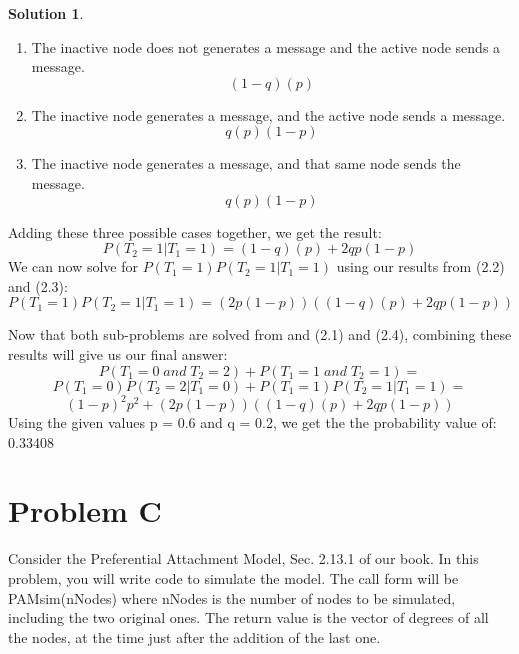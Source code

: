 \documentclass[paper=a4, fontsize=11pt]{scrartcl} %
\numberwithin{equation}{section} %
\numberwithin{figure}{section} %
\numberwithin{table}{section} %
\theoremstyle{definition}
\newtheorem*{solution}{Solution}
\begin{document}
\begin{solution}
\begin{enumerate}
            \begin{enumerate}
                \item The inactive node does not generates a message and the active node sends a message.
                $$(1-q)(p)$$
                \item The inactive node generates a message, and the active node sends a message.
                $$q(p)(1-p)$$
                \item The inactive node generates a message, and that same node sends the message.
                $$q(p)(1-p)$$
            \end{enumerate}
            Adding these three possible cases together, we get the result:
            \begin{equation}
                P(T_{2}=1|T_{1}=1) = (1-q)(p)+2qp(1-p)
            \end{equation}
            We can now solve for \(P(T_{1}=1)P(T_{2}=1|T_{1}=1)\) using our results from (2.2) and (2.3):
            \begin{equation}
                P(T_{1}=1)P(T_{2}=1|T_{1}=1) = (2p(1-p))((1-q)(p)+2qp(1-p))
            \end{equation}
        \end{enumerate} 
        Now that both sub-problems are solved from and (2.1) and (2.4), combining these results will give us our final answer:
        \begin{equation}
            P(T_{1}=0 \; and \; T_{2}=2) + P(T_{1}=1 \; and \; T_{2}=1) =
        \end{equation}
        \begin{equation}
            P(T_{1}=0)P(T_{2}=2|T_{1}=0) + P(T_{1}=1)P(T_{2}=1|T_{1}=1) =
        \end{equation}
        \begin{equation}
            (1-p)^2p^2 + (2p(1-p))((1-q)(p)+2qp(1-p))
        \end{equation}
        Using the given values p = 0.6 and q = 0.2, we get the the probability value of: 0.33408
    \end{solution}



\section{Problem C}
Consider the Preferential Attachment Model, Sec. 2.13.1 of our book. In this problem, you will write code to simulate the model. The call form will be PAMsim(nNodes) where nNodes is the number of nodes to be simulated, including the two original ones. The return value is the vector of degrees of all the nodes, at the time just after the addition of the last one.
\end{document}
